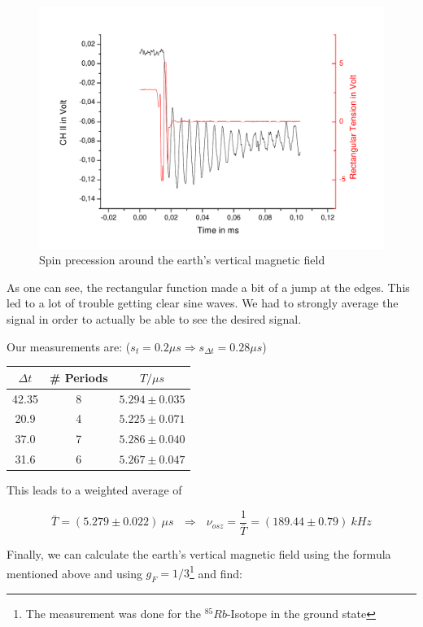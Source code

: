 \begin{figure}[H]
\centering \includegraphics[width=\textwidth]{BilderAusw/Spinpr.pdf}
\caption{Spin precession around the earth's vertical magnetic field}
\end{figure}

As one can see, the rectangular function made a bit of a jump at the edges. This led to a lot of trouble getting clear sine waves. We had to strongly average the signal in order to actually be able to see the desired signal.

Our measurements are: ($s_t = 0.2 \mu s \Rightarrow s_{\Delta t} = 0.28 \mu s$)

\begin{center}
\begin{tabular}[H]{c c c}
$\Delta t$ & \# Periods & $T/\mu s$\\ \hline
42.35 & 8 & $5.294 \pm 0.035$\\
20.9   & 4 & $5.225 \pm 0.071$\\
37.0   & 7 & $5.286 \pm  0.040$\\
31.6   & 6 & $5.267 \pm  0.047$\\
\end{tabular}
\end{center}

This leads to a weighted average of

$$ \bar T = (5.279 \pm 0.022)\ \mu s \ \ \ \Rightarrow \ \ \ \nu_{osz}=\frac{1}{\bar T}= (189.44 \pm 0.79)\ kHz$$

Finally, we can calculate the earth's vertical magnetic field using the formula mentioned above and using $g_F = 1/3$\footnote{The measurement was done for the $^{85}Rb$-Isotope in the ground state} and find:

